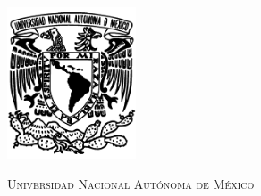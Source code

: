 \begin{titlepage}
  \thispagestyle{empty}
  \begin{minipage}[c][0.17\textheight][c]{0.25\textwidth}
    \begin{center}
    \hspace*{-15mm}
      \includegraphics[height=4.5cm]{Imagenes/escudounam_negro.jpg}
    \end{center}
  \end{minipage}
  \begin{minipage}[c][0.195\textheight][t]{0.75\textwidth}
    \begin{center}
      \vspace{0.3cm}
             {\color{black}\textsc{\huge Universidad Nacional Autónoma de México} }\\[1cm]
          

\end{center}
\end{minipage}
\end{titlepage}
